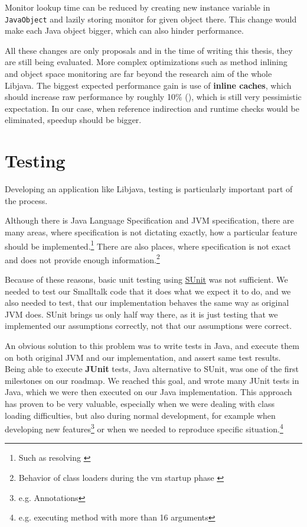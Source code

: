 \documentclass[11pt,twoside,a4paper]{book}
\let\Chapter\chapter
\def\chapter{\addtocontents{lol}{\protect\addvspace{10pt}}\Chapter}
\newcommand{\libjava}{{Libjava}}
\begin{document}
Monitor lookup time can be reduced by creating new instance variable in \texttt{JavaObject} and lazily storing monitor for given object there.
This change would make each Java object bigger, which can also hinder performance.

All these changes are only proposals and in the time of writing this thesis, they are still being evaluated.
More complex optimizations such as method inlining and object space monitoring are far beyond the research aim of the whole \libjava{}.
The biggest expected performance gain is use of \textbf{inline caches}, which should increase raw performance by roughly 10\% (\cite{inline-caches}), which is still very pessimistic expectation.
In our case, when reference indirection and runtime checks would be eliminated, speedup should be bigger.


\chapter{Testing}
\label{chap:testing}

Developing an application like \libjava{}, testing is particularly important part of the process. 

Although there is Java Language Specification and JVM specification, there are many areas, where specification is not dictating exactly, how a particular feature should be implemented.\footnote{Such as resolving \cite[section~2.17.1]{vmspec}} There are also places, where specification is not exact and does not provide enough information.\footnote{Behavior of class loaders during the vm startup phase \cite[section~5.3.1]{vmspec}} 

Because of these reasons, basic unit testing using \href{http://sunit.sourceforge.net/}{SUnit} was not sufficient. 
We needed to test our Smalltalk code that it does what we expect it to do, and we also needed to test, that our implementation behaves the same way as original JVM does. 
SUnit brings us only half way there, as it is just testing that we implemented our assumptions correctly, not that our assumptions were correct.

An obvious solution to this problem was to write tests in Java, and execute them on both original JVM and our implementation, and assert same test results. 
Being able to execute \textbf{JUnit} tests, Java alternative to SUnit, was one of the first milestones on our roadmap. 
We reached this goal, and wrote many JUnit tests in Java, which  we were then executed on our Java implementation. 
This approach has proven to be very valuable, especially when we were dealing with class loading difficulties, but also during normal development, for example when developing new features\footnote{e.g. Annotations} or when we needed to reproduce specific situation.\footnote{e.g. executing method with more than 16 arguments} 
\end{document}
